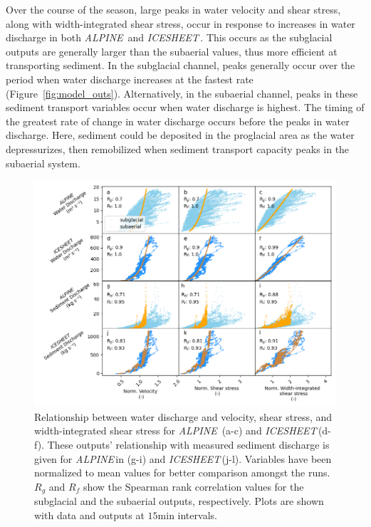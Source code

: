 \documentclass[draft]{agujournal2019}
\newcommand{\alpine}{\textit{ALPINE}\,}
\newcommand{\icesheet}{\textit{ICESHEET}\,}
\newcommand{\unit}[1]{$\mathrm{#1}$}
\begin{document}
Over the course of the season, large peaks in water velocity and shear stress, along with width-integrated shear stress, occur in response to increases in water discharge in both \alpine{} and \icesheet{}.
This occurs as the subglacial outputs are generally larger than the subaerial values, thus more efficient at transporting sediment.
In the subglacial channel, peaks generally occur over the period when water discharge increases at the fastest rate (Figure~\ref{fig:model_outs}).
Alternatively, in the subaerial channel, peaks in these sediment transport variables occur when water discharge is highest.
The timing of the greatest rate of change in water discharge occurs before the peaks in water discharge.
Here, sediment could be deposited in the proglacial area as the water depressurizes, then remobilized when sediment transport capacity peaks in the subaerial system.

\begin{figure}[h]
  \centering
  \includegraphics[width=0.9\linewidth]{Fig3.png}
  \caption{Relationship between water discharge and velocity, shear stress, and width-integrated shear stress for \alpine{} (a-c) and \icesheet (d-f).
    These outputs' relationship with measured sediment discharge is given for \alpine in (g-i) and \icesheet (j-l).
    Variables have been normalized to mean values for better comparison amongst the runs.
    $R_g$ and $R_f$ show the Spearman rank correlation values for the subglacial and the subaerial outputs, respectively.
    Plots are shown with data and outputs at $15$\unit{min} intervals.
  }
  \label{fig:Qw_vari}
\end{figure}
\end{document}
